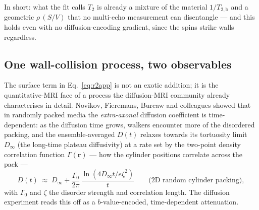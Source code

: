 In short: what the fit calls $T_2$ is already a mixture of the material
$1/T_{2,\mathrm{b}}$ and a geometric $\rho\,(S/V)$ that no multi-echo measurement can
disentangle --- and this holds even with no diffusion-encoding gradient, since the
spins strike walls regardless.

\subsection{One wall-collision process, two observables}
\label{sec:theory:dual}

The surface term in Eq.~\eqref{eq:r2app} is not an exotic addition; it is the
quantitative-MRI face of a process the diffusion-MRI community already
characterises in detail. Novikov, Fieremans, Burcaw and colleagues
\citep{Novikov2014, Burcaw2015, NovikovKiselev2010} showed that in randomly packed media the
\emph{extra-axonal} diffusion coefficient is time-dependent: as the diffusion
time grows, walkers encounter more of the disordered packing, and the
ensemble-averaged $D(t)$ relaxes towards its tortuosity limit $D_\infty$ (the
long-time plateau diffusivity) at a rate set by the two-point density correlation
function $\Gamma(\mathbf r)$ --- how the cylinder positions correlate across the pack ---
\begin{equation}
  D(t) \;\approx\; D_\infty + \frac{\Gamma_0}{2\pi}\,\frac{\ln(4 D_\infty t/e\zeta^2)}{t}
  \qquad\text{(2D random cylinder packing)},
  \label{eq:dt}
\end{equation}
with $\Gamma_0$ and $\zeta$ the disorder strength and correlation length. The
diffusion experiment reads this off as a $b$-value-encoded, time-dependent
attenuation.

